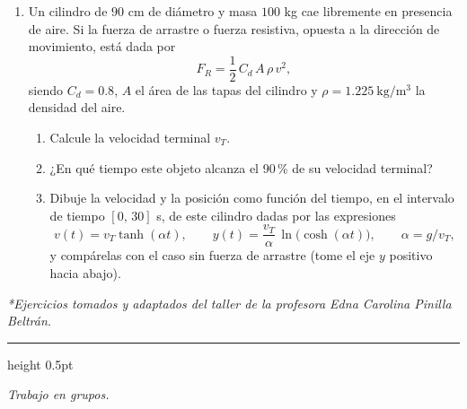 \documentclass[11pt, letterpaper]{article}
\begin{document}
\begin{enumerate}[label=\arabic*., leftmargin=*, itemsep=8pt]
		\item Un cilindro de $90$ cm de diámetro y masa $100$ kg cae libremente en presencia de aire. Si la fuerza de arrastre o fuerza resistiva, opuesta a la dirección de movimiento, está dada por
		\begin{equation*}
			F_R = \dfrac{1}{2}\,C_d\,A\,\rho\,v^{2},
		\end{equation*}
		siendo $C_d = 0.8$, $A$ el área de las tapas del cilindro y $\rho = 1.225\ \mathrm{kg/m^3}$ la densidad del aire.
		\begin{enumerate}[label=\alph*)]
			\item Calcule la velocidad terminal $v_T$.
			\item ¿En qué tiempo este objeto alcanza el 90\,\% de su velocidad terminal?
			\item Dibuje la velocidad y la posición como función del tiempo, en el intervalo de tiempo $[0,\,30]$ s, de este cilindro dadas por las expresiones
			\begin{equation*}
				v(t) = v_T \tanh(\alpha t), \qquad y(t) = \dfrac{v_T}{\alpha}\,\ln\!\bigl(\cosh(\alpha t)\bigr), \qquad \alpha = g/v_T,
			\end{equation*}
			y compárelas con el caso sin fuerza de arrastre (tome el eje $y$ positivo hacia abajo).
		\end{enumerate}
		
	\end{enumerate}
	
	\vfill
	\noindent
	\begin{center}
		\small\textit{*Ejercicios tomados y adaptados del taller de la profesora Edna Carolina Pinilla Beltrán.}
	\end{center}
	
	\vspace{0.2cm}
	{\color{UnalGreen}\hrule height 0.5pt}
	\begin{center}
		\small
		\textit{Trabajo en grupos.}
	\end{center}
	
\end{document}
